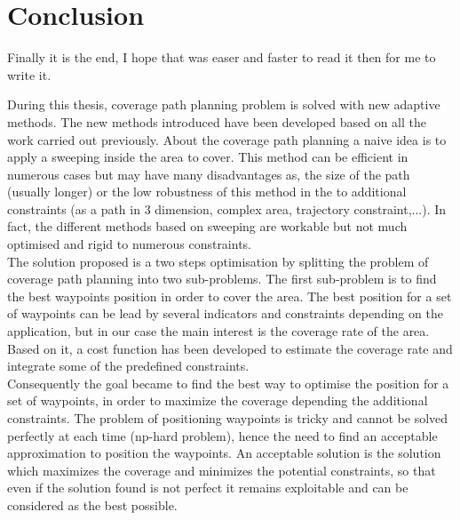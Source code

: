 \chapter{Conclusion}\label{chap:Conclu}

\minitoc


Finally it is the end, I hope that was easer and faster to read it then for me to write it.

During this thesis, coverage path planning problem is solved with new adaptive methods. The new methods introduced have been developed based on all the work carried out previously. 
About the coverage path planning a naive idea is to apply a sweeping inside the area to cover. This method can be efficient in numerous cases but may have many disadvantages as, the size of the path (usually longer) 
or the low robustness of this method in the to additional constraints (as a path in 3 dimension, complex area, trajectory constraint,...). In fact,  the different methods based on sweeping are workable but not much optimised and rigid to numerous constraints. \\
The solution proposed is a two steps optimisation by splitting the problem of coverage path planning into two sub-problems. 
The first sub-problem is to find the best waypoints position in order to cover the area. 
The best position for a set of waypoints can be lead by several indicators and constraints depending on the application, but in our case the main interest is the coverage rate of the area. Based on it, a cost function has been developed to estimate the coverage rate and integrate some of the predefined constraints.\\
Consequently the goal became to find the best way to optimise the position for a set of waypoints, in order to maximize the coverage depending the additional constraints. The problem of positioning waypoints is tricky and cannot be solved perfectly at each time (np-hard problem), hence the need to find an acceptable approximation to position the waypoints. An acceptable solution is the solution which maximizes the coverage and minimizes the potential constraints, so that even if the solution found is not perfect it remains exploitable and can be considered as the best possible.
